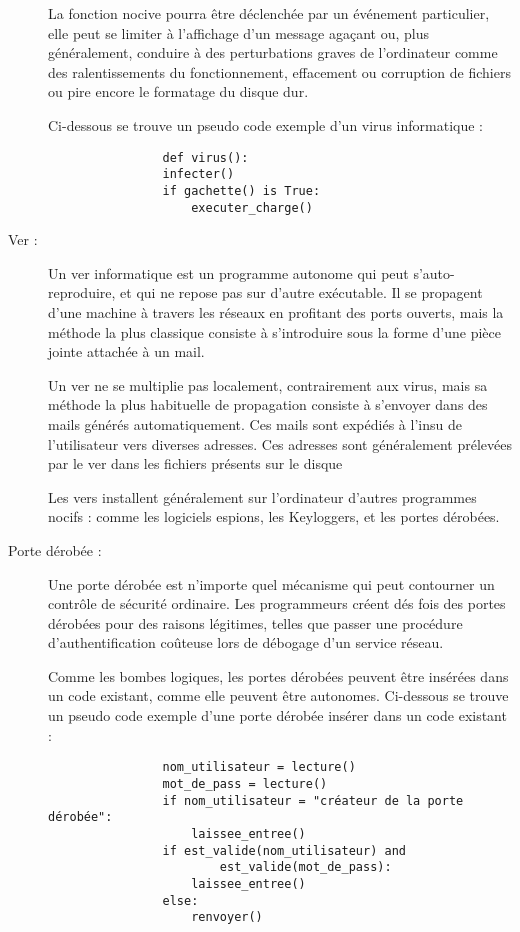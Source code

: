 \begin{description}
            La fonction nocive pourra être déclenchée par un événement particulier, elle peut se limiter 
            à l'affichage d'un message agaçant ou, plus généralement, conduire à des perturbations graves 
            de l'ordinateur comme des ralentissements du fonctionnement, effacement ou corruption de 
            fichiers ou pire encore le formatage du disque dur. \cite{virus_informatique} %

            Ci-dessous se trouve un pseudo code exemple d'un virus informatique :
            \begin{verbatim}
                def virus():
                infecter()
                if gachette() is True:
                    executer_charge()
            \end{verbatim}

        \item[Ver :] Un ver informatique est un programme autonome qui peut s'auto-reproduire, 
            et qui ne repose pas sur d’autre exécutable. Il se propagent d'une machine à travers les 
            réseaux en profitant des ports ouverts, mais la méthode la plus classique consiste à s'introduire 
            sous la forme d'une pièce jointe attachée à un mail.

            Un ver ne se multiplie pas localement, contrairement aux virus, mais sa méthode la plus 
            habituelle de propagation consiste à s'envoyer dans des mails générés automatiquement. 
            Ces mails sont expédiés à l'insu de l'utilisateur vers diverses adresses. 
            Ces adresses sont généralement prélevées par le ver dans les fichiers présents sur le disque

            Les vers installent généralement sur l'ordinateur d'autres programmes nocifs : comme les logiciels 
            espions, les Keyloggers, et les portes dérobées. \cite{ver_informatique}

        \item[Porte dérobée :] \label{backdoor} Une porte dérobée est n'importe quel mécanisme qui peut contourner un
            contrôle de sécurité ordinaire. Les programmeurs créent dés fois des portes dérobées pour 
            des raisons légitimes, telles que passer une procédure d'authentification coûteuse lors 
            de débogage d'un service réseau.

            Comme les bombes logiques, les portes dérobées peuvent être insérées dans un code existant, comme elle
            peuvent être autonomes. Ci-dessous se trouve un pseudo code exemple d'une porte dérobée insérer dans 
            un code existant :
            \begin{verbatim}
                nom_utilisateur = lecture()
                mot_de_pass = lecture()
                if nom_utilisateur = "créateur de la porte dérobée":
                    laissee_entree()
                if est_valide(nom_utilisateur) and 
                        est_valide(mot_de_pass):
                    laissee_entree()
                else:
                    renvoyer()
            \end{verbatim}


\end{description}
